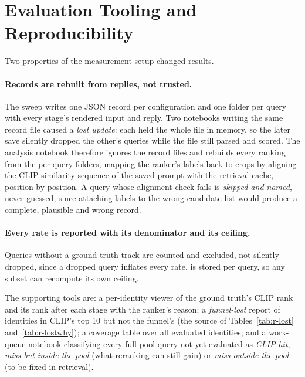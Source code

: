 \section{Evaluation Tooling and Reproducibility}

Two properties of the measurement setup changed results.

\paragraph{Records are rebuilt from replies, not trusted.} The sweep writes one JSON
record per configuration and one folder per query with every stage's rendered input
and reply. Two notebooks writing the same record file caused a \emph{lost update}:
each held the whole file in memory, so the later save silently dropped the other's
queries while the file still parsed and scored. The analysis notebook therefore
ignores the record files and rebuilds every ranking from the per-query folders,
mapping the ranker's labels back to crops by aligning the CLIP-similarity sequence
of the saved prompt with the retrieval cache, position by position. A query whose
alignment check fails is \emph{skipped and named}, never guessed, since attaching
labels to the wrong candidate list would produce a complete, plausible and wrong
record.

\paragraph{Every rate is reported with its denominator and its ceiling.} Queries
without a ground-truth track are counted and excluded, not silently dropped, since
a dropped query inflates every rate.  is stored per query, so any
subset can recompute its own ceiling.

The supporting tools are: a per-identity viewer of the ground truth's CLIP rank and
its rank after each stage with the ranker's reason; a \emph{funnel-lost} report of
identities in CLIP's top 10 but not the funnel's (the source of
Tables~\ref{tab:r-lost} and~\ref{tab:r-lostwhy}); a coverage table over all
evaluated identities; and a work-queue notebook classifying every full-pool query
not yet evaluated as \emph{CLIP hit}, \emph{miss but inside the pool} (what
reranking can still gain) or \emph{miss outside the pool} (to be fixed in
retrieval).

